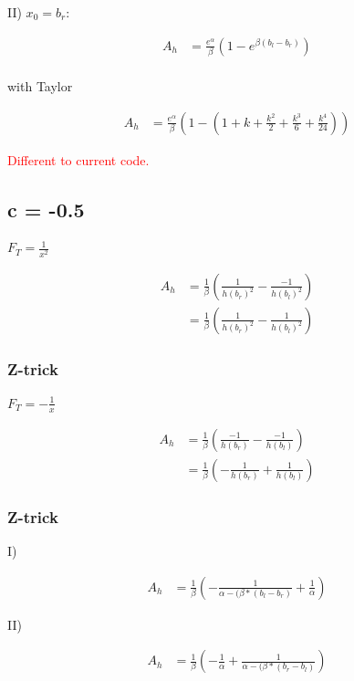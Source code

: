 \documentclass[]{article}
\begin{document}
II) $x_0 = b_r$:

\begin{align*}
A_h &=\frac{e^{\alpha}}{\beta} \left(1 - e^{\beta (b_l - b_r)}\right) \\
\end{align*}

with Taylor

\begin{align*}
A_h &= \frac{e^{\alpha}}{\beta} \left(1 - \left(1 + k + \frac{k^2}{2} +  \frac{k^3}{6} + \frac{k^4}{24} \right) \right)
\end{align*}

\textcolor{red}{Different to current code.}

\subsection{c = -0.5}

$F_T = \frac{1}{x^2}$

\begin{align*}
A_h &= \frac{1}{\beta} \left(\frac{1}{h(b_r)^2} - \frac{-1}{h(b_l)^2} \right) \\
& = \frac{1}{\beta} \left(\frac{1}{h(b_r)^2} - \frac{1}{h(b_l)^2} \right)
\end{align*}

\subsubsection{Z-trick}


$F_T = - \frac{1}{x}$

\begin{align*}
A_h &= \frac{1}{\beta} \left(\frac{-1}{h(b_r)} - \frac{-1}{h(b_l)} \right) \\
& = \frac{1}{\beta} \left(- \frac{1}{h(b_r)} + \frac{1}{h(b_l)} \right)
\end{align*}

\subsubsection{Z-trick}

I)

\begin{align*}
A_h & = \frac{1}{\beta} \left(- \frac{1}{\alpha - (\beta * (b_l - b_r)} + \frac{1}{\alpha} \right)
\end{align*}

II)

\begin{align*}
A_h & = \frac{1}{\beta} \left(- \frac{1}{\alpha} + \frac{1}{\alpha - (\beta * (b_r - b_l)} \right)
\end{align*}
\end{document}
